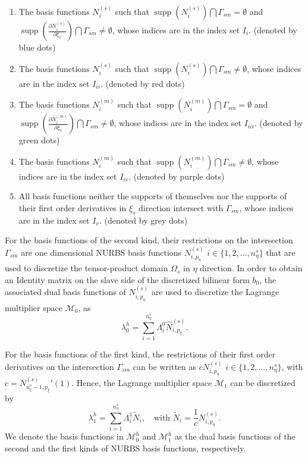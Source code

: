 \documentclass[preprint,12pt]{elsarticle}
\newcommand{\supp}{\mathop{\mathrm{supp}}}
\theoremstyle{remark}
\begin{document}
\begin{enumerate}
    \item The basis functions $N^{(s)}_i$ such that $\supp(N^{(s)}_i)\bigcap\Gamma_{sm}=\emptyset$ and $\supp(\frac{\partial{}N^{(s)}_i}{\partial{\xi_s}})\bigcap\Gamma_{sm}\neq\emptyset$, whose indices are in the index set $I_i$. (denoted by blue dots)
    \item The basis functions $N^{(s)}_i$ such that $\supp(N^{(s)}_i)\bigcap\Gamma_{sm}\neq\emptyset$, whose indices are in the index set $I_{ii}$. (denoted by red dots)
    \item The basis functions $N^{(m)}_i$ such that $\supp(N^{(m)}_i)\bigcap\Gamma_{sm}=\emptyset$ and $\supp(\frac{\partial{}N^{(m)}_i}{\partial{\xi_s}})\bigcap\Gamma_{sm}\neq\emptyset$, whose indices are in the index set $I_{iii}$. (denoted by green dots)
    \item The basis functions $N^{(m)}_i$ such that $\supp(N^{(m)}_i)\bigcap\Gamma_{sm}\neq\emptyset$, whose indices are in the index set $I_{iv}$. (denoted by purple dots)
    \item All basis functions neither the supports of themselves nor the supports of their first order derivatives in $\xi_s$ direction intersect with $\Gamma_{sm}$, whose indices are in the index set $I_{v}$. (denoted by grey dots)
\end{enumerate}\par
For the basis functions of the second kind, their restrictions on the intersection $\Gamma_{sm}$ are one dimensional NURBS basis functions $N^{(s)}_{i,p_\eta}$ $i\in\{1,2,\dots,n_\eta^s\}$ that are used to discretize the tensor-product domain $\Omega_s$ in $\eta$ direction. In order to obtain an Identity matrix on the slave side of the discretized bilinear form $b_0$, the associated dual basis functions of $N^{(s)}_{i,p_\eta}$ are used to discretize the Lagrange multiplier space $\mathcal{M}_0$, as
\begin{equation}
    \lambda_0^h=\sum_{i=1}^{n_\eta^s}\Lambda_i^0\hat{N}^{(s)}_{i,p_\eta}.
\end{equation}\par
For the basis functions of the first kind, the restrictions of their first order derivatives on the intersection $\Gamma_{sm}$ can be written as $cN^{(s)}_{i,p_\eta}$ $i\in\{1,2,\dots,n_\eta^s\}$, with $c={N^{(s)}_{n_\xi^s-1,p_\xi}}'(1)$. Hence, the Lagrange multiplier space $\mathcal{M}_1$ can be discretized by
\begin{equation}
    \lambda_1^h=\sum_{i=1}^{n_\eta^s}\Lambda_i^1\tilde{N}_i,\quad \text{with } \tilde{N}_i=\frac{1}{c}N^{(s)}_{i,p_\eta}.
\end{equation}
We denote the basis functions in $\mathcal{M}_0^h$ and $\mathcal{M}_1^h$ as the dual basis functions of the second and the first kinds of NURBS basis functions, respectively. \par
\end{document}
